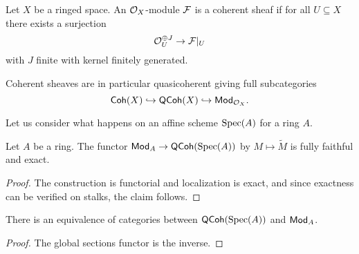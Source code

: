 \begin{definition}\label{def: coherent sheaf}
    Let $X$ be a ringed space. An $\mathcal{O}_{X}$-module $\mathcal{F}$ is a coherent sheaf if for all $U\subseteq X$ there exists a surjection 
    $$\mathcal{O}_{U}^{\oplus J}\to\mathcal{F}|_{U}$$
    with $J$ finite with kernel finitely generated. 
\end{definition}
\begin{remark}
    Coherent sheaves are in particular quasicoherent giving full subcategories 
    $$\mathsf{Coh}(X)\hookrightarrow\mathsf{QCoh}(X)\hookrightarrow\mathsf{Mod}_{\mathcal{O}_{X}}.$$
\end{remark}
Let us consider what happens on an affine scheme $\operatorname{Spec}(A)$ for a ring $A$. 
\begin{proposition}\label{prop: fully faithful exact modules on affine schemes}
    Let $A$ be a ring. The functor $\mathsf{Mod}_{A}\to\mathsf{QCoh}(\operatorname{Spec}(A))$ by $M\mapsto\widetilde{M}$ is fully faithful and exact. 
\end{proposition}
\begin{proof}
    The construction is functorial and localization is exact, and since exactness can be verified on stalks, the claim follows. 
\end{proof}
\begin{proposition}\label{prop: equivalence of categories modules on affine schemes}
    There is an equivalence of categories between $\mathsf{QCoh}(\operatorname{Spec}(A))$ and $\mathsf{Mod}_{A}$. 
\end{proposition}
\begin{proof}
    The global sections functor is the inverse. 
\end{proof}